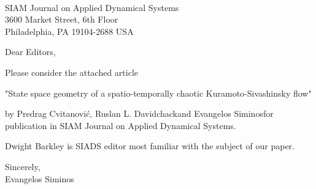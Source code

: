 \documentclass[12pt]{letter}
\begin{document}
\begin{letter}{
\\
SIAM Journal on Applied Dynamical Systems\\
3600 Market Street, 6th Floor\\
Philadelphia, PA 19104-2688 USA\\

}


\opening{Dear Editors,}

Please consider the attached article

"State space geometry of a spatio-temporally chaotic Kuramoto-Sivashinsky flow"

by Predrag Cvitanovi\'c\footnotemark[1], Ruslan L. Davidchack\footnotemark[2]
and Evangelos Siminos\footnotemark[1] for publication in SIAM Journal on
Applied Dynamical Systems.

Dwight Barkley is SIADS editor most familiar with the subject of our paper.

\renewcommand{\thefootnote}{\fnsymbol{footnote}}
\renewcommand{\thefootnote}{\arabic{footnote}}

\closing{Sincerely,\\ Evangelos Siminos}


\end{letter}
\end{document}
